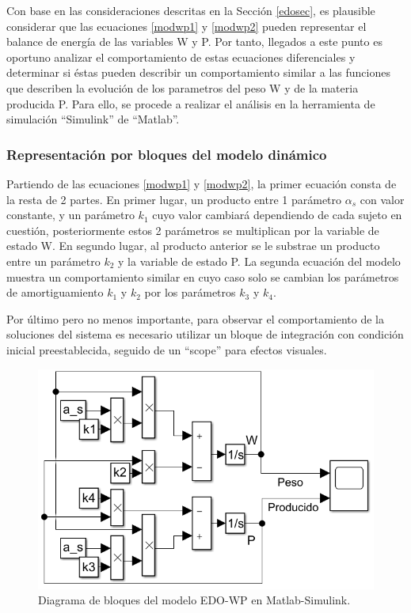 Con base en las consideraciones descritas en la Sección \ref{edosec}, es plausible considerar que las ecuaciones \ref{modwp1} y \ref{modwp2} pueden representar el balance de energía de las variables W y P. Por tanto, llegados a este punto es oportuno analizar el comportamiento de estas ecuaciones diferenciales y determinar si éstas pueden describir un comportamiento similar a las funciones que describen la evolución de los parametros del peso W y de la materia producida P. Para ello, se procede a realizar el análisis en la herramienta de simulación ``Simulink'' de ``Matlab''.
\subsubsection{Representación por bloques del modelo dinámico}

Partiendo de las ecuaciones \ref{modwp1} y \ref{modwp2}, la primer ecuación consta de la resta de 2 partes. En primer lugar, un producto entre 1 parámetro $\alpha_{s}$ con valor constante, y un parámetro $k_{1}$ cuyo valor cambiará dependiendo de cada sujeto en cuestión, posteriormente estos 2 parámetros se multiplican por la variable de estado W. En segundo lugar, al producto anterior se le substrae un producto entre un parámetro $k_{2}$ y la variable de estado P. La segunda ecuación del modelo muestra un comportamiento similar en cuyo caso solo se cambian los parámetros de amortiguamiento $k_{1}$ y $k_{2}$ por los parámetros $k_{3}$ y $k_{4}$.

Por último pero no menos importante, para observar el comportamiento de la soluciones del sistema es necesario utilizar un bloque de integración con condición inicial preestablecida, seguido de un ``scope'' para efectos visuales.


\begin{figure}[H]
	 \begin{center}
	 \includegraphics[scale=0.69]{img/simulinkwp1.png}
	 \end{center}
	 \caption{Diagrama de bloques del modelo EDO-WP en Matlab-Simulink. \label{modbloques}}
\end{figure}


